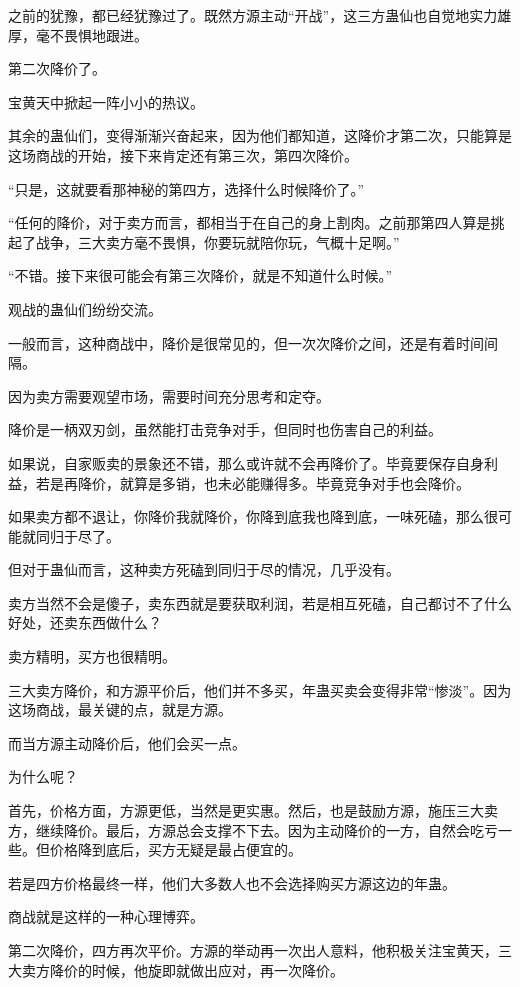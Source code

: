 \begin{this_body}
之前的犹豫，都已经犹豫过了。既然方源主动“开战”，这三方蛊仙也自觉地实力雄厚，毫不畏惧地跟进。

第二次降价了。

宝黄天中掀起一阵小小的热议。

其余的蛊仙们，变得渐渐兴奋起来，因为他们都知道，这降价才第二次，只能算是这场商战的开始，接下来肯定还有第三次，第四次降价。

“只是，这就要看那神秘的第四方，选择什么时候降价了。”

“任何的降价，对于卖方而言，都相当于在自己的身上割肉。之前那第四人算是挑起了战争，三大卖方毫不畏惧，你要玩就陪你玩，气概十足啊。”

“不错。接下来很可能会有第三次降价，就是不知道什么时候。”

观战的蛊仙们纷纷交流。

一般而言，这种商战中，降价是很常见的，但一次次降价之间，还是有着时间间隔。

因为卖方需要观望市场，需要时间充分思考和定夺。

降价是一柄双刃剑，虽然能打击竞争对手，但同时也伤害自己的利益。

如果说，自家贩卖的景象还不错，那么或许就不会再降价了。毕竟要保存自身利益，若是再降价，就算是多销，也未必能赚得多。毕竟竞争对手也会降价。

如果卖方都不退让，你降价我就降价，你降到底我也降到底，一味死磕，那么很可能就同归于尽了。

但对于蛊仙而言，这种卖方死磕到同归于尽的情况，几乎没有。

卖方当然不会是傻子，卖东西就是要获取利润，若是相互死磕，自己都讨不了什么好处，还卖东西做什么？

卖方精明，买方也很精明。

三大卖方降价，和方源平价后，他们并不多买，年蛊买卖会变得非常“惨淡”。因为这场商战，最关键的点，就是方源。

而当方源主动降价后，他们会买一点。

为什么呢？

首先，价格方面，方源更低，当然是更实惠。然后，也是鼓励方源，施压三大卖方，继续降价。最后，方源总会支撑不下去。因为主动降价的一方，自然会吃亏一些。但价格降到底后，买方无疑是最占便宜的。

若是四方价格最终一样，他们大多数人也不会选择购买方源这边的年蛊。

商战就是这样的一种心理博弈。

第二次降价，四方再次平价。方源的举动再一次出人意料，他积极关注宝黄天，三大卖方降价的时候，他旋即就做出应对，再一次降价。


\end{this_body}
